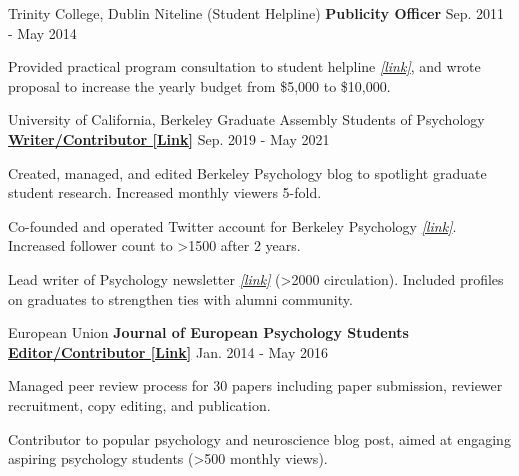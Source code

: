 \begin{cventries}
  \cventry
  	{Trinity College, Dublin}
  	{Niteline (Student Helpline)} %
    {\textbf{Publicity Officer}} %
    {Sep. 2011 - May 2014} %
    {
      \begin{cvitems} %
        \item {Provided practical program consultation to student helpline \href{https://niteline.ie/}{\textit{[link]}}, and wrote proposal to increase the yearly budget from \$5,000 to \$10,000.}
      \end{cvitems}
    }


  \cventry 
    {University of California, Berkeley} %
    {Graduate Assembly Students of Psychology}
    {\href{https://psychblog.berkeley.edu/opinion/2019/09/09/Graduate-School-Advice/}{\textbf{Writer/Contributor [Link]}}} %
    {Sep. 2019 - May 2021} %
    {
      \begin{cvitems} 
      	\item {Created, managed, and edited Berkeley Psychology blog to spotlight graduate student research. Increased monthly viewers 5-fold.}
      	\item {Co-founded and operated Twitter account for Berkeley Psychology \href{https://twitter.com/BerkeleyPsych}{\textit{[link]}}. Increased follower count to >1500 after 2 years.}
      	\item {Lead writer of Psychology newsletter \href{https://psychology.berkeley.edu/sites/default/files/newsletters/2021spr_fullnewsletter_v2.pdf}{\textit{[link]}} (>2000 circulation). Included profiles on graduates to strengthen ties with alumni community.}
      \end{cvitems}
    }
    
\begin{cventries}

  \cventry
    {European Union}
    {\textbf{Journal of European Psychology Students}} %
    {\href{https://blog.efpsa.org/2015/09/22/editors-pick-our-favourite-psychology-and-neuroscience-podcasts}{\textbf{Editor/Contributor [Link]}}} %
    {Jan. 2014 - May 2016} %
    {
      \begin{cvitems} %
      	\item {Managed peer review process for 30 papers including paper submission, reviewer recruitment, copy editing, and publication.}
        \item {Contributor to popular psychology and neuroscience blog post, aimed at engaging aspiring psychology students (>500 monthly views).}
      \end{cvitems}
    }


\end{cventries}
\end{cventries}
